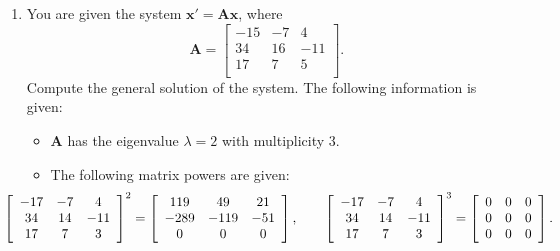 \documentclass[11pt]{article}
\newcommand{\bA}{\mathbf{A}}
\newcommand{\bx}{\mathbf{x}}
\renewcommand{\l}{\lambda}
\begin{document}
\begin{enumerate}
    \item You are given the system $\bx'=\bA\bx$, where 
    $$\bA=
        \left[
\begin{array}{ccc}
 -15 & -7 & 4 \\
 34 & 16 & -11 \\
 17 & 7 & 5 \\
\end{array}
\right].
    $$
Compute the general solution of the system. The following information is given:
\begin{itemize}
    \item $\bA$ has the eigenvalue $\l=2$ with multiplicity 3.
    \item The following matrix powers are given:
    \begin{equation}
        \hspace{-.5 in}\left[
\begin{array}{ccc}
 -17 & -7 & 4 \\
 34 & 14 & -11 \\
 17 & 7 & 3 \\
\end{array}
\right]^2=\left[
\begin{array}{ccc}
 119 & 49 & 21 \\
 -289 & -119 & -51 \\
 0 & 0 & 0 \\
\end{array}
\right]    ,\qquad\left[
\begin{array}{ccc}
 -17 & -7 & 4 \\
 34 & 14 & -11 \\
 17 & 7 & 3 \\
\end{array}
\right]^3= \left[
\begin{array}{ccc}
 0 & 0 & 0 \\
 0 & 0 & 0 \\
 0 & 0 & 0 \\
\end{array}
\right].
    \end{equation}
\end{itemize}






\end{enumerate}
\end{document}
